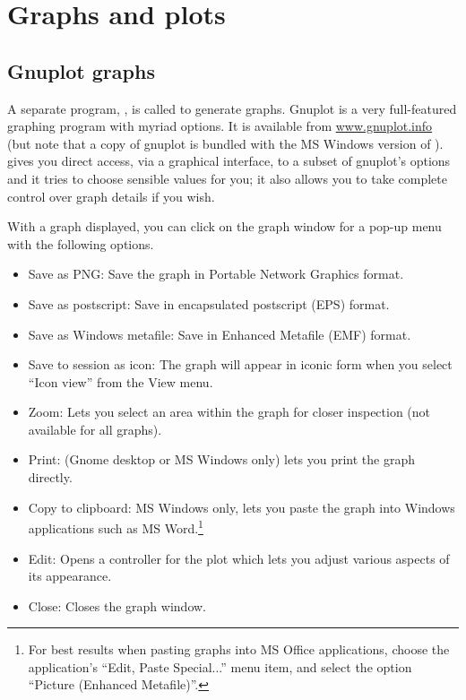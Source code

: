 \chapter{Graphs and plots}
\label{chap-graphs}

\section{Gnuplot graphs}
\label{gnuplot-graphs}

A separate program, , is called to generate graphs.
Gnuplot is a very full-featured graphing program with myriad options.
It is available from \href{http://www.gnuplot.info/}{www.gnuplot.info}
(but note that a copy of gnuplot is bundled with the MS Windows
version of ).   gives you direct access, via a
graphical interface, to a subset of gnuplot's options and it tries to
choose sensible values for you; it also allows you to take complete
control over graph details if you wish.

With a graph displayed, you can click on the graph window for a pop-up
menu with the following options.

\begin{itemize}
\item \textsf{Save as PNG}: Save the graph in Portable Network
  Graphics format.
\item \textsf{Save as postscript}: Save in encapsulated postscript
  (EPS) format.
\item \textsf{Save as Windows metafile}: Save in Enhanced Metafile
  (EMF) format.
\item \textsf{Save to session as icon}: The graph will appear in
  iconic form when you select ``Icon view'' from the View menu.
\item \textsf{Zoom}: Lets you select an area within the graph for
  closer inspection (not available for all graphs).
\item \textsf{Print}: (Gnome desktop or MS Windows only) lets you
  print the graph directly.
\item \textsf{Copy to clipboard}: MS Windows only, lets you paste the
  graph into Windows applications such as MS Word.\footnote{For best
    results when pasting graphs into MS Office applications, choose
    the application's ``Edit, Paste Special...'' menu item, and select
    the option ``Picture (Enhanced Metafile)''.}
\item \textsf{Edit}: Opens a controller for the plot which lets you
  adjust various aspects of its appearance.
\item \textsf{Close}: Closes the graph window.
\end{itemize}



